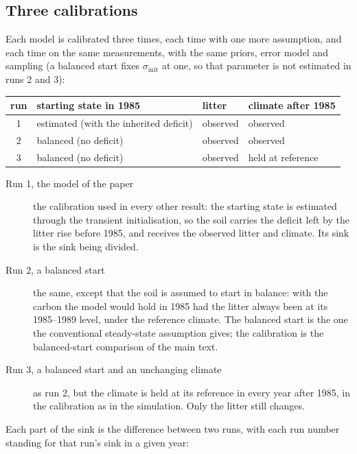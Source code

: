 \documentclass[../HIKET_draft_v1.tex]{subfiles}
\begin{document}
\subsection{Three calibrations}
\label{app:attr_runs}

Each model is calibrated three times, each time with one more assumption, and each time on
the same measurements, with the same priors, error model and sampling (a balanced start
fixes $\sigma_{\mathrm{init}}$ at one, so that parameter is not estimated in runs 2 and 3):

\begin{center}
\begin{tabular}{clll}
\hline
run & starting state in 1985 & litter & climate after 1985 \\
\hline
1 & estimated (with the inherited deficit) & observed & observed \\
2 & balanced (no deficit) & observed & observed \\
3 & balanced (no deficit) & observed & held at reference \\
\hline
\end{tabular}
\end{center}

\begin{description}
  \item[Run 1, the model of the paper] the calibration used in every other result: the
    starting state is estimated through the transient initialisation, so the soil carries
    the deficit left by the litter rise before 1985, and receives the observed litter and
    climate. Its sink is the sink being divided.
  \item[Run 2, a balanced start] the same, except that the soil is assumed to start in
    balance: with the carbon the model would hold in 1985 had the litter always been at its
    1985--1989 level, under the reference climate. The balanced start is the one the
    conventional steady-state assumption gives; the calibration is the balanced-start
    comparison of the main text.
  \item[Run 3, a balanced start and an unchanging climate] as run 2, but the climate is held
    at its reference in every year after 1985, in the calibration as in the simulation. Only
    the litter still changes.
\end{description}

Each part of the sink is the difference between two runs, with each run number standing for
that run's sink in a given year:
\end{document}

